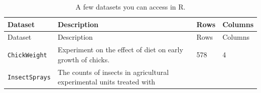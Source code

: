 \documentclass[]{book}
\theoremstyle{definition}
\theoremstyle{definition}
\theoremstyle{remark}
\begin{document}
\begin{longtable}[]{@{}llll@{}}
\caption{\label{tab:datasets} A few datasets you can access in
R.}\tabularnewline
\toprule
\begin{minipage}[b]{0.16\columnwidth}\raggedright\strut
Dataset\strut
\end{minipage} & \begin{minipage}[b]{0.38\columnwidth}\raggedright\strut
Description\strut
\end{minipage} & \begin{minipage}[b]{0.07\columnwidth}\raggedright\strut
Rows\strut
\end{minipage} & \begin{minipage}[b]{0.09\columnwidth}\raggedright\strut
Columns\strut
\end{minipage}\tabularnewline
\midrule
\endfirsthead
\toprule
\begin{minipage}[b]{0.16\columnwidth}\raggedright\strut
Dataset\strut
\end{minipage} & \begin{minipage}[b]{0.38\columnwidth}\raggedright\strut
Description\strut
\end{minipage} & \begin{minipage}[b]{0.07\columnwidth}\raggedright\strut
Rows\strut
\end{minipage} & \begin{minipage}[b]{0.09\columnwidth}\raggedright\strut
Columns\strut
\end{minipage}\tabularnewline
\midrule
\endhead
\begin{minipage}[t]{0.16\columnwidth}\raggedright\strut
\texttt{ChickWeight}\strut
\end{minipage} & \begin{minipage}[t]{0.38\columnwidth}\raggedright\strut
Experiment on the effect of diet on early growth of chicks.\strut
\end{minipage} & \begin{minipage}[t]{0.07\columnwidth}\raggedright\strut
578\strut
\end{minipage} & \begin{minipage}[t]{0.09\columnwidth}\raggedright\strut
4\strut
\end{minipage}\tabularnewline
\begin{minipage}[t]{0.16\columnwidth}\raggedright\strut
\texttt{InsectSprays}\strut
\end{minipage} & \begin{minipage}[t]{0.38\columnwidth}\raggedright\strut
The counts of insects in agricultural experimental units treated with

\end{minipage}
\end{longtable}
\end{document}
